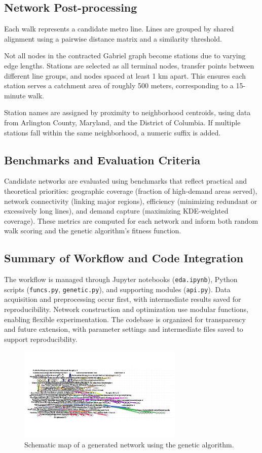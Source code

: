 \documentclass[manuscript,nonacm]{acmart}
\begin{document}
\subsection{Network Post-processing}
Each walk represents a candidate metro line. Lines are grouped by shared alignment using a pairwise distance matrix and a similarity threshold.

Not all nodes in the contracted Gabriel graph become stations due to varying edge lengths. Stations are selected as all terminal nodes, transfer points between different line groups, and nodes spaced at least 1 km apart. This ensures each station serves a catchment area of roughly 500 meters, corresponding to a 15-minute walk.

Station names are assigned by proximity to neighborhood centroids, using data from Arlington County, Maryland, and the District of Columbia. If multiple stations fall within the same neighborhood, a numeric suffix is added.

\subsection{Benchmarks and Evaluation Criteria}
Candidate networks are evaluated using benchmarks that reflect practical and theoretical priorities: geographic coverage (fraction of high-demand areas served), network connectivity (linking major regions), efficiency (minimizing redundant or excessively long lines), and demand capture (maximizing KDE-weighted coverage). These metrics are computed for each network and inform both random walk scoring and the genetic algorithm's fitness function.

\subsection{Summary of Workflow and Code Integration}
The workflow is managed through Jupyter notebooks (\texttt{eda.ipynb}), Python scripts (\texttt{funcs.py}, \texttt{genetic.py}), and supporting modules (\texttt{api.py}). Data acquisition and preprocessing occur first, with intermediate results saved for reproducibility. Network construction and optimization use modular functions, enabling flexible experimentation. The codebase is organized for transparency and future extension, with parameter settings and intermediate files saved to support reproducibility.

\begin{figure}[h]
    \centering
    \includegraphics[width=0.7\textwidth]{img/lines_genetic.png}
    \caption{Schematic map of a generated network using the genetic algorithm.}
    \label{fig:schematic2}
\end{figure}
\end{document}
